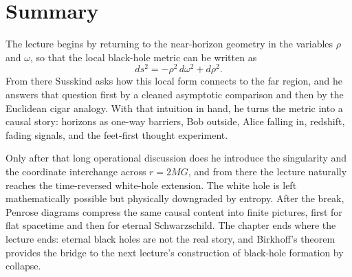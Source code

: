 \section{Summary}

The lecture begins by returning to the near-horizon geometry in the variables \(\rho\) and \(\omega\), so that the local black-hole metric can be written as
\[
ds^2=-\rho^2\,d\omega^2+d\rho^2.
\]
From there Susskind asks how this local form connects to the far region, and he answers that question first by a cleaned asymptotic comparison and then by the Euclidean cigar analogy. With that intuition in hand, he turns the metric into a causal story: horizons as one-way barriers, Bob outside, Alice falling in, redshift, fading signals, and the feet-first thought experiment.

Only after that long operational discussion does he introduce the singularity and the coordinate interchange across \(r=2MG\), and from there the lecture naturally reaches the time-reversed white-hole extension. The white hole is left mathematically possible but physically downgraded by entropy. After the break, Penrose diagrams compress the same causal content into finite pictures, first for flat spacetime and then for eternal Schwarzschild. The chapter ends where the lecture ends: eternal black holes are not the real story, and Birkhoff's theorem provides the bridge to the next lecture's construction of black-hole formation by collapse.